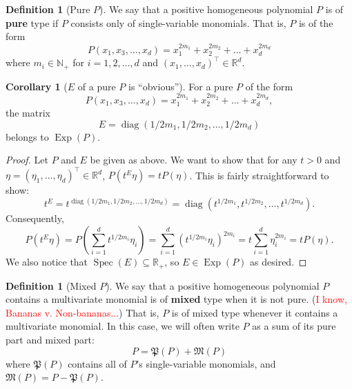 \documentclass{article}
\theoremstyle{definition}
\newcommand\Exp{\operatorname{Exp}}
\newcommand\diag{\operatorname{diag}}
\newcommand\Spec{\operatorname{Spec}}
\newcommand{\R}{\mathbb{R}}
\newcommand{\lp}{\left(}
\newcommand{\rp}{\right)}
\theoremstyle{theorem}
\newtheorem{definition}[theorem]{Definition}
\newtheorem{corollary}[theorem]{Corollary}
\begin{document}
\begin{framed}
\begin{definition}[Pure $P$]\label{def:PureP}
We say that a positive homogeneous polynomial $P$ is of \textbf{pure} type if $P$ consists only of single-variable monomials. That is, $P$ is of the form
\begin{equation*}
    P(x_1,x_3,\dots,x_d) = x_1^{2m_1} + x_2^{2m_2} + \dots + x_d^{2m_d}
\end{equation*}
where $m_i\in \mathbb{N}_+$ for $i=1,2,\dots,d$ and $(x_1,\dots,x_d)^\top\in \R^d$. 
\end{definition}


\begin{corollary}[$E$ of a pure $P$ is ``obvious'']\label{cor:E}
For a pure $P$ of the form 
\begin{equation*}
    P(x_1,x_3,\dots,x_d) = x_1^{2m_1} + x_2^{2m_2} + \dots + x_d^{2m_d},
\end{equation*}
the matrix
\begin{equation*}
    E = \diag{(1/2m_1, 1/2m_2, \dots, 1/2m_d)}
\end{equation*}
belongs to $\Exp(P)$.
\end{corollary}

\begin{proof}
Let $P$ and $E$ be given as above. We want to show that for any $t>0$ and $\eta = (\eta_1,\dots,\eta_d)^\top\in \R^d$, $P(t^E\eta) = tP(\eta)$. This is fairly  straightforward to show:
\begin{equation*}
    t^E = t^{\diag{(1/2m_1, 1/2m_2, \dots, 1/2m_d)}} =  \diag{(t^{1/2m_1}, t^{1/2m_2}, \dots, t^{1/2m_d})}.
\end{equation*}
Consequently,
\begin{equation*}
    P(t^E \eta) = P\lp \sum^d_{i=1} t^{1/2m_i}\eta_i \rp = \sum^d_{i=1} \lp t^{1/2m_i}\eta_i \rp^{2m_i} = t\sum^d_{i=1} \eta_i^{2m_i} = tP(\eta).
\end{equation*}
We also notice that $\Spec{(E)}\subseteq \R_+$, so $E\in \Exp(P)$ as desired. 
\end{proof}



\begin{definition}[Mixed $P$]
We say that a positive homogeneous polynomial $P$ contains a multivariate monomial is of \textbf{mixed} type when it is not pure. (\textcolor{red}{I know, Bananas v. Non-bananas...}) That is, $P$ is of mixed type whenever it contains a multivariate monomial. In this case, we will often write $P$ as a sum of its pure part and mixed part:
\begin{equation*}
    P = \mathfrak{P}(P) + \mathfrak{M}(P)
\end{equation*}
where $\mathfrak{P}(P)$ contains all of $P$'s single-variable monomials, and $\mathfrak{M}(P) = P - \mathfrak{P}(P)$.
\end{definition}


\end{framed}
\end{document}

